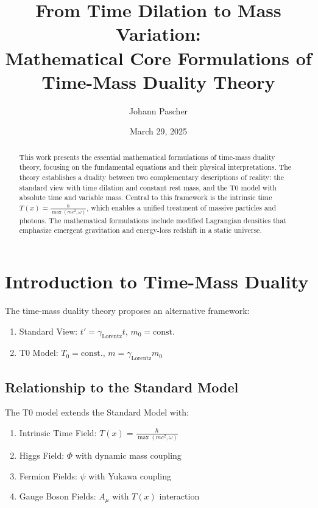 \documentclass[12pt,a4paper]{article}
\title{From Time Dilation to Mass Variation: \\ Mathematical Core Formulations of Time-Mass Duality Theory}
\author{Johann Pascher}
\date{March 29, 2025}
\newcommand{\Tfield}{T(x)}
\newcommand{\Tzero}{T_0}
\newcommand{\gammaf}{\gamma_{\text{Lorentz}}}
\theoremstyle{definition}
\theoremstyle{remark}
\begin{document}
	
	\maketitle
	
	\begin{abstract}
		This work presents the essential mathematical formulations of time-mass duality theory, focusing on the fundamental equations and their physical interpretations. The theory establishes a duality between two complementary descriptions of reality: the standard view with time dilation and constant rest mass, and the T0 model with absolute time and variable mass. Central to this framework is the intrinsic time \( \Tfield = \frac{\hbar}{\max(m c^2, \omega)} \), which enables a unified treatment of massive particles and photons. The mathematical formulations include modified Lagrangian densities that emphasize emergent gravitation and energy-loss redshift in a static universe.
	\end{abstract}
	
	\tableofcontents
	\newpage
	
	\section{Introduction to Time-Mass Duality}
	The time-mass duality theory proposes an alternative framework:
	\begin{enumerate}
		\item Standard View: \( t' = \gammaf t \), \( m_0 = \text{const.} \)
		\item T0 Model: \( \Tzero = \text{const.} \), \( m = \gammaf m_0 \)
	\end{enumerate}
	
	\subsection{Relationship to the Standard Model}
	The T0 model extends the Standard Model with:
	\begin{enumerate}
		\item Intrinsic Time Field: \( \Tfield = \frac{\hbar}{\max(m c^2, \omega)} \)
		\item Higgs Field: \( \Phi \) with dynamic mass coupling
		\item Fermion Fields: \( \psi \) with Yukawa coupling
		\item Gauge Boson Fields: \( A_\mu \) with \( \Tfield \) interaction
	\end{enumerate}
	
\end{document}
